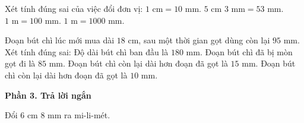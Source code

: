 \begin{ex} %
Xét tính đúng sai của việc đổi đơn vị:
\choiceTF
{\True $1\text{ cm} = 10\text{ mm}$.}
{\True $5\text{ cm } 3\text{ mm} = 53\text{ mm}$.}
{$1\text{ m} = 100\text{ mm}$.}
{\True $1\text{ m} = 1000\text{ mm}$.}
\end{ex}

\begin{ex} %
Đoạn bút chì lúc mới mua dài $18\text{ cm}$, sau một thời gian gọt dùng còn lại $95\text{ mm}$. Xét tính đúng sai:
\choiceTF
{\True Độ dài bút chì ban đầu là $180\text{ mm}$.}
{\True Đoạn bút chì đã bị mòn gọt đi là $85\text{ mm}$.}
{Đoạn bút chì còn lại dài hơn đoạn đã gọt là $15\text{ mm}$.}
{\True Đoạn bút chì còn lại dài hơn đoạn đã gọt là $10\text{ mm}$.}
\end{ex}

\textbf{Phần 3. Trả lời ngắn}

\begin{ex} %
Đổi $6\text{ cm } 8\text{ mm}$ ra mi-li-mét.
\end{ex}


